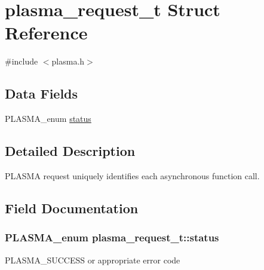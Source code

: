 \hypertarget{structplasma__request__t}{}\section{plasma\+\_\+request\+\_\+t Struct Reference}
\label{structplasma__request__t}


{\ttfamily \#include $<$plasma.\+h$>$}

\subsection*{Data Fields}
\begin{DoxyCompactItemize}
\item 
P\+L\+A\+S\+M\+A\+\_\+enum \hyperlink{structplasma__request__t_a86cd12f11d72a3aa4fb94f6cc406c507_a86cd12f11d72a3aa4fb94f6cc406c507}{status}
\end{DoxyCompactItemize}


\subsection{Detailed Description}


 P\+L\+A\+S\+M\+A request uniquely identifies each asynchronous function call. 

\subsection{Field Documentation}
\hypertarget{structplasma__request__t_a86cd12f11d72a3aa4fb94f6cc406c507_a86cd12f11d72a3aa4fb94f6cc406c507}{}
\subsubsection[{status}]{\setlength{\rightskip}{0pt plus 5cm}P\+L\+A\+S\+M\+A\+\_\+enum plasma\+\_\+request\+\_\+t\+::status}\label{structplasma__request__t_a86cd12f11d72a3aa4fb94f6cc406c507_a86cd12f11d72a3aa4fb94f6cc406c507}
P\+L\+A\+S\+M\+A\+\_\+\+S\+U\+C\+C\+E\+S\+S or appropriate error code 